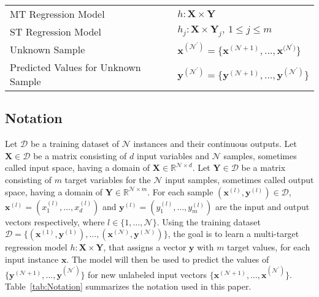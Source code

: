 \documentclass[preprint,12pt]{elsarticle}
\begin{document}
\begin{table*}[b!]
\begin{threeparttable}
{\begin{tabular}{ll}
MT Regression Model & $h : \bm{X} \times \bm{Y}$ \\
ST Regression Model & $h_j : \bm{X} \times \bm{Y}_j,\, 1 \leq j \leq m$ \\
Unknown Sample & $\bm{x}^{(\mathcal N^\prime)} = \{\bm {x}^{(\mathcal N+1)}, \ldots, \bm {x}^{\mathcal (N^\prime)}\}$ \\
Predicted Values for Unknown Sample & $\bm{y}^{(\mathcal N^\prime)} = \{\bm{y}^{(\mathcal N+1)}, \ldots, \bm {y}^{(\mathcal N^\prime)}\}$\\
\bottomrule
\end{tabular}}
\end{threeparttable}
\label{tab:Notation}
\bigskip
\end{table*}

\subsection{Notation}\label{subsec:notation}
Let $\mathcal{D}$ be a training dataset of $\mathcal{N}$ instances and their continuous outputs. Let $\bm{X} \in \mathcal{D}$ be a matrix consisting of $d$ input variables and $\mathcal{N}$ samples, sometimes called input space, having a domain of $\bm{X} \in \mathbb{R}^{\mathcal{N} \times d}$. Let $\bm{Y} \in \mathcal{D}$ be a matrix consisting of $m$ target variables for the $\mathcal{N}$ input samples, sometimes called output space, having a domain of $\bm{Y} \in \mathbb{R}^{\mathcal{N} \times m}$. For each sample $(\bm x^{(l)},\bm y^{(l)}) \in \mathcal{D}$, $\bm{x}^{(l)} = (x_1^{(l)}, \ldots, x_d^{(l)})$ and $\bm y^{(l)} = (y_1^{(l)}, \ldots, y_m^{(l)})$ are the input and output vectors respectively, where $l \in \{1, \ldots, \mathcal{N}\}$. Using the training dataset $\mathcal{D} = \{(\bm x^{(1)},\bm y^{(1)}), \ldots, (\bm x^{(\mathcal{N})},\bm y^{(\mathcal{N})})\}$, the goal is to learn a multi-target regression model $h : \bm{X} \times \bm{Y}$, that assigns a vector $\bm{y}$ with $m$ target values, for each input instance $\bm{x}$. The model will then be used to predict the values of $\{\bm{y}^{(\mathcal{N}+1)}, \ldots, \bm{y}^{(\mathcal{N}^\prime)}\}$ for new unlabeled input vectors $\{\bm{x}^{(\mathcal{N}+1)}, \ldots, \bm{x}^{(\mathcal{N}^\prime)}\}$. Table~\ref{tab:Notation} summarizes the notation used in this paper.
\end{document}
